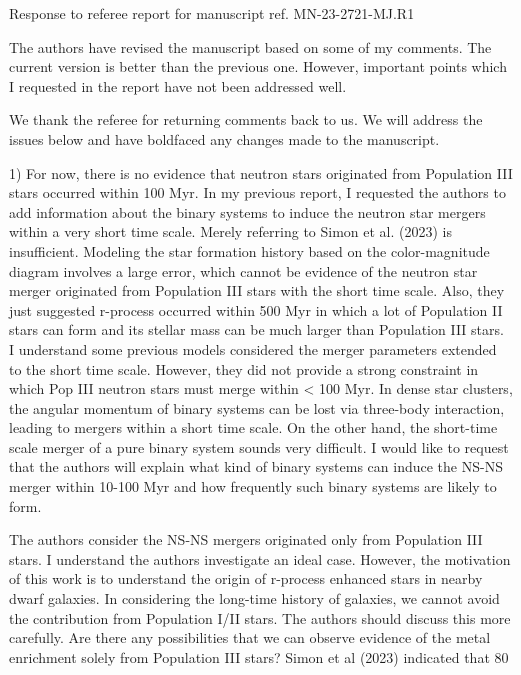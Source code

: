 \documentclass[11pt]{article}
\begin{document}
\begin{center} 
\bfseries{
\begin{large}
  Response to referee report for manuscript ref. MN-23-2721-MJ.R1
\end{large}
}
\end{center}

\begin{tcolorbox}[colback={lightgray}]
The authors have revised the manuscript based on some of my comments. The current version is better than the previous one. However, important points which I requested in the report have not been addressed well.
\end{tcolorbox}

We thank the referee for returning comments back to us. We will address the issues below and have boldfaced any changes made to the manuscript.

\begin{tcolorbox}[colback={lightgray}]
1) For now, there is no evidence that neutron stars originated from Population III stars occurred within 100 Myr. In my previous report, I requested the authors to add information about the binary systems to induce the neutron star mergers within a very short time scale. Merely referring to Simon et al. (2023) is insufficient. Modeling the star formation history based on the color-magnitude diagram involves a large error, which cannot be evidence of the neutron star merger originated from Population III stars with the short time scale. Also, they just suggested r-process occurred within 500 Myr in which a lot of Population II stars can form and its stellar mass can be much larger than Population III stars. I understand some previous models considered the merger parameters extended to the short time scale. However, they did not provide a strong constraint in which Pop III neutron stars must merge within < 100 Myr. In dense star clusters, the angular momentum of binary systems can be lost via three-body interaction, leading to mergers within a short time scale. On the other hand, the short-time scale merger of a pure binary system sounds very difficult. I would like to request that the authors will explain what kind of binary systems can induce the NS-NS merger within 10-100 Myr and how frequently such binary systems are likely to form.
\end{tcolorbox}


\begin{tcolorbox}[colback={lightgray}]   
    The authors consider the NS-NS mergers originated only from Population III stars. I understand the authors investigate an ideal case. However, the motivation of this work is to understand the origin of r-process enhanced stars in nearby dwarf galaxies. In considering the long-time history of galaxies, we cannot avoid the contribution from Population I/II stars. The authors should discuss this more carefully. Are there any possibilities that we can observe evidence of the metal enrichment solely from Population III stars? Simon et al (2023) indicated that 80%
\end{tcolorbox}
\end{document}
